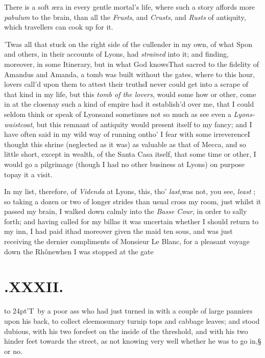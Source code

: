 \documentclass{article}
\begin{document}
There is a soft æra in every gentle mortal’s life,
where such a story affords more \textit{pabulum} to the brain, than
all the \textit{Frusts}, and \textit{Crusts}, and \textit{Rusts} of
antiquity, which travellers can cook up for it.

\tsh ’Twas all that stuck on the right\break
side of the cullender in my own, of what Spon
and others, in their accounts of Lyons, had \textit{strained} into it; and finding,
moreover, in some Itinerary, but in what God knows\tsk That sacred to the fidelity
of Amandus and Amanda, a tomb was built without the gates, where to this hour,
lovers call’d upon them to attest their truths\tsk I never could get into a scrape
of that kind in my life, but this \textit{tomb of the lovers}, would some how or
other, come in at the close\tsk nay such a kind of empire had it establish’d over me,
that I could seldom think or speak of Lyons\tsk and sometimes not so much as see even
a \textit{Lyons-waistcoat}, but this remnant of antiquity would present itself to my
fancy; and I have often said in my wild way of running on\tsk tho’ I fear with some
irreverence\tsk \lqq I thought this shrine (neglected as it was) as valuable as that of
Mecca, and so little short, except in wealth, of the Santa Casa itself, that some
time or other, I would go a pilgrimage (though I had no other business at Lyons) on
purpose to\break pay it a visit.

In my list, therefore, of \textit{Videnda} at Lyons, this, tho’ \textit{last},\tsk was
not, you see, \textit{least} ; so taking a dozen or two of longer strides than usual
cross my room, just whilst it passed my brain, I walked down calmly into the
\textit{Basse Cour}, in order to sally forth; and having called for my bill\tsk as it
was uncertain whether I should return to my inn, I had paid it\tsh had moreover
given the maid ten sous, and was just receiving the dernier compliments of Monsieur
Le Blanc, for a pleasant voyage down the Rhône\tsh when I was stopped at the gate
\tsh

\vfill{}\eject
\section{.\enspace XXXII.}

\lettrine{\hbox to 24pt{\Tsk}\lower-10pt\hbox{\large’}T}{\,} by a poor ass who had\break
just turned in with a couple\break
of large panniers upon his back, to collect eleemosunary turnip
tops and cabbage leaves; and stood dubious, with his two
forefeet on the inside of the threshold, and with his two
hinder feet towards the street, as not knowing very well whether
he was to go in,§ or no.
\end{document}

